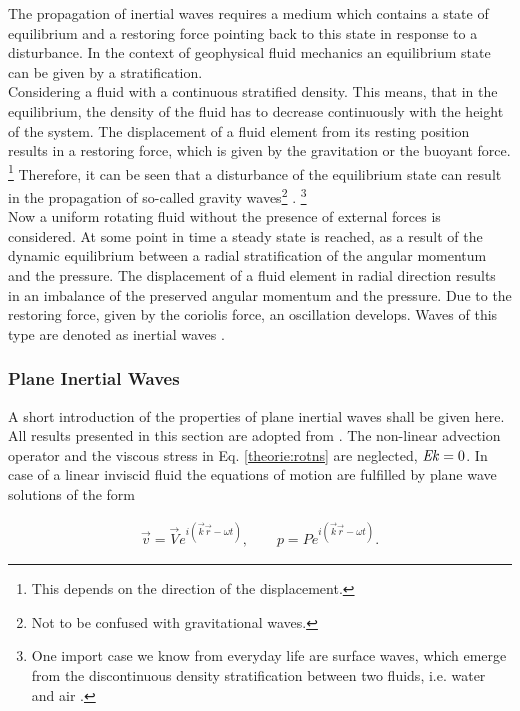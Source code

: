 The propagation of inertial waves requires a medium which contains a state of equilibrium and
a restoring force pointing back to this state in response to a disturbance.
In the context of geophysical fluid mechanics an equilibrium state can be given by a stratification.\\
Considering a fluid with a continuous stratified density.
This means, that in the equilibrium, the density of the fluid has to decrease
continuously with the height of the system. The displacement of a fluid element
 from its resting position results in a restoring force, which is  given by the
gravitation or the buoyant force.
\footnote{This depends on the direction of the displacement.}
Therefore, it can be seen that a disturbance of the equilibrium state can result in the
propagation of so-called  gravity waves\footnote{Not to be confused with gravitational waves.} \cite{Clausen2011}.
\footnote{One import case we know from everyday life are surface waves, which emerge
from the discontinuous density stratification between two fluids, i.e. water and air \cite{Clausen2011}.}\\

Now a uniform rotating fluid without the presence of external forces is considered.
At some point in time a steady state is reached, as a result of the dynamic equilibrium between
a radial stratification of the angular momentum and the pressure.
The displacement of a fluid element in radial direction results in
an imbalance of the preserved angular momentum and the pressure.
Due to the restoring force, given by the coriolis force, an oscillation develops.
Waves of this type are denoted as inertial waves \cite{Clausen2011}.

\subsubsection{Plane Inertial Waves}

A short introduction of the properties of plane inertial waves shall be given here.
All results presented in this section are adopted from \citep{Greenspan1990}.%
The non-linear advection operator and the viscous stress in Eq. \ref{theorie:rotns} are neglected, $\mbox{\textit{Ek}} =0$.
In case of  a linear inviscid fluid the equations of motion are fulfilled by plane wave solutions of the form

\begin{align}
    \vec{v} = \vec{V} e^{i(\vec{k}\vec{r}  - \omega t )}, \qquad
    p = P e^{i(\vec{k}\vec{r}  - \omega t )}.
\end{align}

